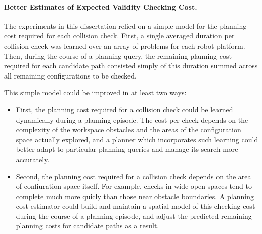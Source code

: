\paragraph{Better Estimates of Expected Validity Checking Cost.}
The experiments in this dissertation relied on a simple model for
the planning cost required for each collision check.
First,
a single averaged duration per collision check was learned over an array
of problems for each robot platform.
Then, during the course of a planning query,
the remaining planning cost required for each candidate path
consisted simply of this duration summed across all remaining
configurations to be checked.

This simple model could be improved in at least two ways:
\begin{itemize}
\item First, the planning cost required for a collision check could
   be learned dynamically during a planning episode.
   The cost per check depends on the complexity of the workspace
   obstacles and the areas of the configuration space actually
   explored,
   and a planner which incorporates such learning could better adapt to
   particular planning queries and manage its search more accurately.
\item Second, the planning cost required for a collision check depends
   on the area of confiuration space itself.
   For example,
   checks in wide open spaces tend to complete much more quicly than
   those near obstacle boundaries.
   A planning cost estimator could build and maintain a spatial model
   of this checking cost during the course of a planning episode,
   and adjust the predicted remaining planning costs for candidate
   paths as a result.
\end{itemize}

